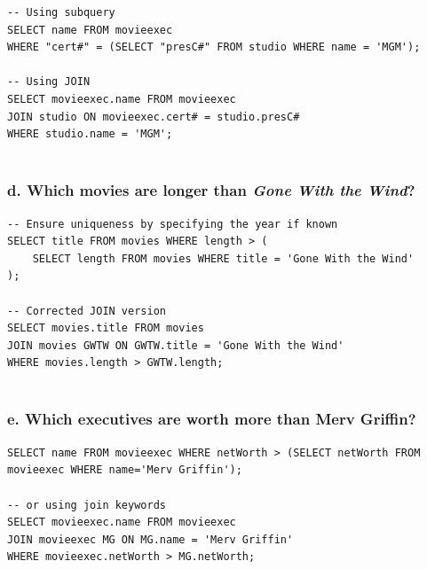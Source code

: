\documentclass{cshwk}
\begin{document}
\begin{lstlisting}
-- Using subquery
SELECT name FROM movieexec
WHERE "cert#" = (SELECT "presC#" FROM studio WHERE name = 'MGM');

-- Using JOIN
SELECT movieexec.name FROM movieexec
JOIN studio ON movieexec.cert# = studio.presC#
WHERE studio.name = 'MGM';
    
\end{lstlisting}

\subsubsection*{d. Which movies are longer than \textit{Gone With the Wind}?}

\begin{lstlisting}
-- Ensure uniqueness by specifying the year if known
SELECT title FROM movies WHERE length > (
    SELECT length FROM movies WHERE title = 'Gone With the Wind'
);

-- Corrected JOIN version
SELECT movies.title FROM movies
JOIN movies GWTW ON GWTW.title = 'Gone With the Wind'
WHERE movies.length > GWTW.length;
    
\end{lstlisting}

\subsubsection*{e. Which executives are worth more than Merv Griffin?}

\begin{lstlisting}
SELECT name FROM movieexec WHERE netWorth > (SELECT netWorth FROM movieexec WHERE name='Merv Griffin');

-- or using join keywords
SELECT movieexec.name FROM movieexec
JOIN movieexec MG ON MG.name = 'Merv Griffin'
WHERE movieexec.netWorth > MG.netWorth;
\end{lstlisting}
\end{document}
